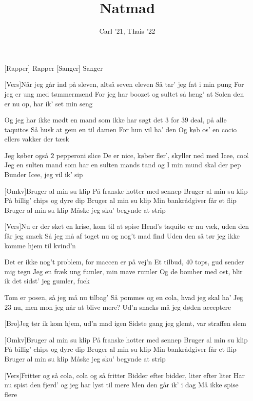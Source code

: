 \documentclass[a4paper,11pt]{article}
\title{Natmad}
\author{Carl '21, Thais '22}
\begin{document}
\maketitle

\begin{roles}
[Rapper] Rapper
[Sanger] Sanger
\end{roles}

\begin{song}

[Vers]Når jeg går ind på sleven, altså seven eleven
Så tar' jeg fat i min pung
For jeg er ung med tømmermænd 
For jeg har boozet og sultet så læng' at
Solen den er nu op, har ik' set min seng

Og jeg har ikke mødt en mand som ikke har søgt det
$3$ for $39$ deal, på alle taquitos
Så husk at gem en til damen
For hun vil ha' den
Og køb os' en cocio ellers vakker der tæsk 

Jeg køber også $2$ pepperoni slice
De er nice, køber fler', skyller ned med Icee, cool
Jeg en sulten mand som har en sulten mands tand og
I min mund skal der pep
Bunder Icee, jeg vil ik' sip

[Omkv]Bruger al min su klip
På franske hotter med sennep 
Bruger al min su klip
På billig' chips og dyre dip
Bruger al min su klip
Min bankrådgiver får et flip
Bruger al min su klip
Måske jeg sku' begynde at strip 

[Vers]Nu er der sket en krise, kom til at spise 
Hend's taquito er nu væk, uden den får jeg smæk
Så jeg må af toget nu og nog't mad find
Uden den så tør jeg ikke komme hjem til kvind'n 

Det er ikke nog't problem, for maccen er på vej'n
Et tilbud, $40$ tops, gud sender mig tegn
Jeg en fræk ung fumler, min mave rumler
Og de bomber med ost, blir ik det sidst' jeg gumler, fuck

Tom er posen, så jeg må nu tilbag'
Så pommes og en cola, hvad jeg skal ha' 
Jeg $23$ nu, men mon jeg når at blive mere?
Ud'n snacks må jeg døden acceptere

[Bro]Jeg tør ik kom hjem, ud'n mad igen
Sidste gang jeg glemt, var straffen slem

[Omkv]Bruger al min su klip
På franske hotter med sennep 
Bruger al min su klip
På billig' chips og dyre dip
Bruger al min su klip
Min bankrådgiver får et flip
Bruger al min su klip
Måske jeg sku' begynde at strip 

[Vers]Fritter og så cola, cola og så fritter
Bidder efter bidder, liter efter liter
Har nu spist den fjerd' og jeg har lyst til mere
Men den går ik' i dag 
Må ikke spise flere


\end{song}
\end{document}
